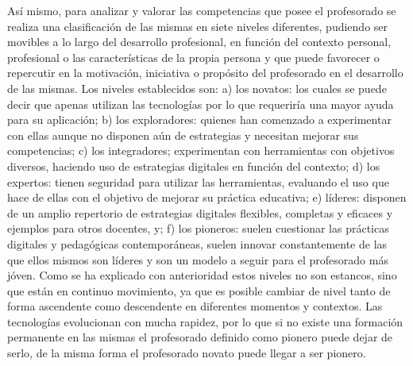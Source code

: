 \documentclass[spanish]{textolivre}
\begin{document}
Así mismo, para analizar y valorar las competencias que posee el profesorado se realiza una clasificación de las mismas en siete niveles diferentes, pudiendo ser movibles a lo largo del desarrollo profesional, en función del contexto personal, profesional o las características de la propia persona y que puede favorecer o repercutir en la motivación, iniciativa o propósito del profesorado en el desarrollo de las mismas. Los niveles establecidos son: a) los novatos: los cuales se puede decir que apenas utilizan las tecnologías por lo que requeriría una mayor ayuda para su aplicación; b) los exploradores: quienes han comenzado a experimentar con ellas aunque no disponen aún de estrategias y necesitan mejorar sus competencias; c) los integradores; experimentan con herramientas con objetivos diversos, haciendo uso de estrategias digitales en función del contexto; d) los expertos: tienen seguridad para utilizar las herramientas, evaluando el uso que hace de ellas con el objetivo de mejorar su práctica educativa; e) líderes: disponen de un amplio repertorio de estrategias digitales flexibles, completas y eficaces y ejemplos para otros docentes, y; f) los pioneros: suelen cuestionar las prácticas digitales y pedagógicas contemporáneas, suelen innovar constantemente de las que ellos mismos son líderes y son un modelo a seguir para el profesorado más jóven. Como se ha explicado con anterioridad estos niveles no son estancos, sino que están en continuo movimiento, ya que es posible cambiar de nivel tanto de forma ascendente como descendente en diferentes momentos y contextos. Las tecnologías evolucionan con mucha rapidez, por lo que si no existe una formación permanente en las mismas el profesorado definido como pionero puede dejar de serlo, de la misma forma el profesorado novato puede llegar a ser pionero.
\end{document}
